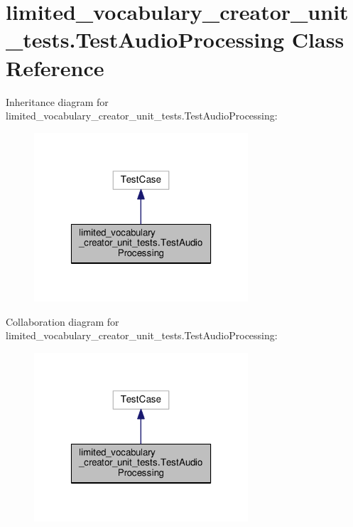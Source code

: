 \hypertarget{classlimited__vocabulary__creator__unit__tests_1_1TestAudioProcessing}{\section{limited\-\_\-vocabulary\-\_\-creator\-\_\-unit\-\_\-tests.\-Test\-Audio\-Processing Class Reference}
\label{classlimited__vocabulary__creator__unit__tests_1_1TestAudioProcessing}
}


Inheritance diagram for limited\-\_\-vocabulary\-\_\-creator\-\_\-unit\-\_\-tests.\-Test\-Audio\-Processing\-:
\nopagebreak
\begin{figure}[H]
\begin{center}
\leavevmode
\includegraphics[width=226pt]{classlimited__vocabulary__creator__unit__tests_1_1TestAudioProcessing__inherit__graph}
\end{center}
\end{figure}


Collaboration diagram for limited\-\_\-vocabulary\-\_\-creator\-\_\-unit\-\_\-tests.\-Test\-Audio\-Processing\-:
\nopagebreak
\begin{figure}[H]
\begin{center}
\leavevmode
\includegraphics[width=226pt]{classlimited__vocabulary__creator__unit__tests_1_1TestAudioProcessing__coll__graph}
\end{center}
\end{figure}
